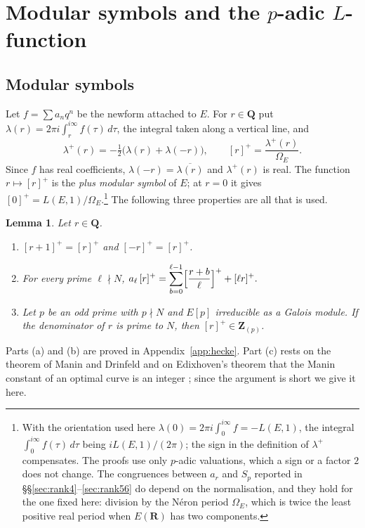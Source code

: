 \documentclass[11pt]{amsart}
\newtheorem{lemma}[theorem]{Lemma}
\theoremstyle{definition}
\newcommand{\Q}{\mathbf{Q}}
\newcommand{\Z}{\mathbf{Z}}
\newcommand{\R}{\mathbf{R}}
\begin{document}
\section{Modular symbols and the \texorpdfstring{$p$}{p}-adic \texorpdfstring{$L$}{L}-function}\label{sec:symbols}

\subsection{Modular symbols}
Let $f=\sum a_nq^n$ be the newform attached to $E$. For $r\in\Q$ put $\lambda(r)=2\pi i\int_r^{i\infty}f(\tau)\,d\tau$, the integral taken along a vertical line, and
\[
\lambda^+(r)=-\tfrac12\bigl(\lambda(r)+\lambda(-r)\bigr),\qquad [r]^+=\frac{\lambda^+(r)}{\Omega_E}.
\]
Since $f$ has real coefficients, $\lambda(-r)=\overline{\lambda(r)}$ and $\lambda^+(r)$ is real. The function $r\mapsto[r]^+$ is the \emph{plus modular symbol} of $E$; at $r=0$ it gives $[0]^+=L(E,1)/\Omega_E$.\footnote{With the orientation used here $\lambda(0)=2\pi i\int_0^{i\infty}f=-L(E,1)$, the integral $\int_0^{i\infty}f(\tau)\,d\tau$ being $iL(E,1)/(2\pi)$; the sign in the definition of $\lambda^+$ compensates. The proofs use only $p$-adic valuations, which a sign or a factor $2$ does not change. The congruences between $a_r$ and $S_p$ reported in \S\S\ref{sec:rank4}--\ref{sec:rank56} do depend on the normalisation, and they hold for the one fixed here: division by the N\'eron period $\Omega_E$, which is twice the least positive real period when $E(\R)$ has two components.} The following three properties are all that is used.

\begin{lemma}\label{lem:symbols}
Let $r\in\Q$.
\begin{enumerate}
\item[(a)] $[r+1]^+=[r]^+$ and $[-r]^+=[r]^+$.
\item[(b)] For every prime $\ell\nmid N$,
$\displaystyle a_\ell\,[r]^+=\sum_{b=0}^{\ell-1}\Bigl[\frac{r+b}{\ell}\Bigr]^+ +[\ell r]^+ .$
\item[(c)] Let $p$ be an odd prime with $p\nmid N$ and $E[p]$ irreducible as a Galois module. If the denominator of $r$ is prime to $N$, then $[r]^+\in\Z_{(p)}$.
\end{enumerate}
\end{lemma}

Parts (a) and (b) are proved in Appendix~\ref{app:hecke}. Part (c) rests on the theorem of Manin and Drinfeld \cite{Man72,Dri73} and on Edixhoven's theorem that the Manin constant of an optimal curve is an integer \cite{Edi91}; since the argument is short we give it here.
\end{document}
